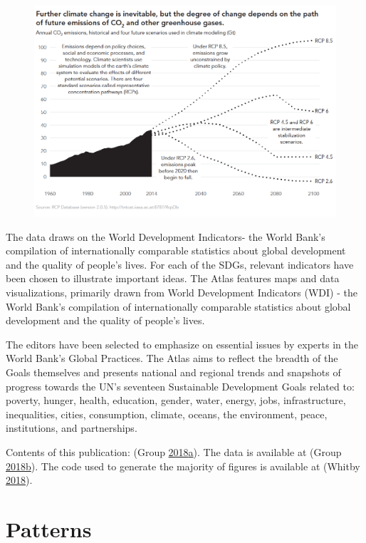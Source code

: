 \documentclass[]{book}
\theoremstyle{definition}
\theoremstyle{definition}
\theoremstyle{definition}
\theoremstyle{remark}
\begin{document}
\begin{figure}
\centering
\includegraphics{images/case_study_3.png}
\caption{}
\end{figure}

The data draws on the World Development Indicators- the World Bank's
compilation of internationally comparable statistics about global
development and the quality of people's lives. For each of the SDGs,
relevant indicators have been chosen to illustrate important ideas. The
Atlas features maps and data visualizations, primarily drawn from World
Development Indicators (WDI) - the World Bank's compilation of
internationally comparable statistics about global development and the
quality of people's lives.

The editors have been selected to emphasize on essential issues by
experts in the World Bank's Global Practices. The Atlas aims to reflect
the breadth of the Goals themselves and presents national and regional
trends and snapshots of progress towards the UN's seventeen Sustainable
Development Goals related to: poverty, hunger, health, education,
gender, water, energy, jobs, infrastructure, inequalities, cities,
consumption, climate, oceans, the environment, peace, institutions, and
partnerships.

Contents of this publication: (Group
\protect\hyperlink{ref-worldbankpub}{2018}\protect\hyperlink{ref-worldbankpub}{a}).
The data is available at (Group
\protect\hyperlink{ref-data_access}{2018}\protect\hyperlink{ref-data_access}{b}).
The code used to generate the majority of figures is available at
(Whitby \protect\hyperlink{ref-worldbankcode}{2018}).

\chapter{Patterns}\label{patterns}
\end{document}
